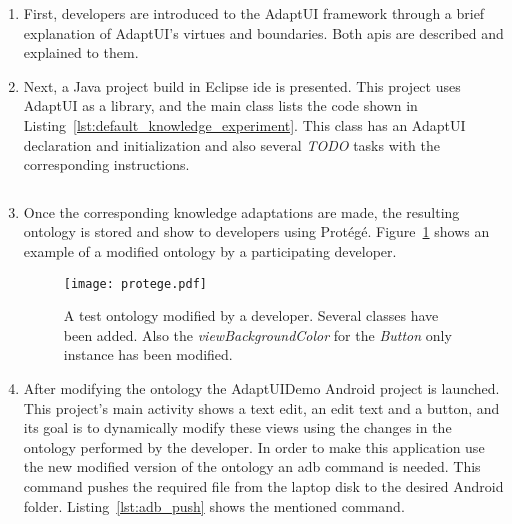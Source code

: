 \begin{enumerate}
  \item First, developers are introduced to the AdaptUI framework through a brief
  explanation of AdaptUI's virtues and boundaries. Both \acp{api} are described
  and explained to them.
  
  \item Next, a Java project build in Eclipse \ac{ide} is presented. This project
  uses AdaptUI as a library, and the main class lists the code shown in
  Listing~\ref{lst:default_knowledge_experiment}. This class has an AdaptUI
  declaration and initialization and also several \textit{TODO} tasks with
  the corresponding instructions. 
  
  \inputminted[linenos=true, fontsize=\footnotesize, frame=lines]{java}{5_experiments_and_results/default_knowledge_experiment.java}

  \item Once the corresponding knowledge adaptations are made, the resulting
  ontology is stored and show to developers using Protégé. Figure~\ref{fig:protege}
  shows an example of a modified ontology by a participating developer.

  \begin{figure}
  \centering
  \texttt{[image: protege.pdf]}
  \caption{A test ontology modified by a developer. Several classes have been
  added. Also the \textit{viewBackgroundColor} for the \textit{Button} only 
  instance has been modified.}
  \label{fig:protege}
  \end{figure}
  
  \item After modifying the ontology the AdaptUIDemo Android project is launched.
  This project's main activity shows a text edit, an edit text and a button, and
  its goal is to dynamically modify these views using the changes in the ontology
  performed by the developer. In order to make this application use the new modified
  version of the ontology an \ac{adb} command is needed. This command pushes the
  required file from the laptop disk to the desired Android folder. 
  Listing~\ref{lst:adb_push} shows the mentioned command.
  
  \inputminted[linenos=true, fontsize=\footnotesize, frame=lines]{java}{5_experiments_and_results/adb_push.java}
  

\end{enumerate}

